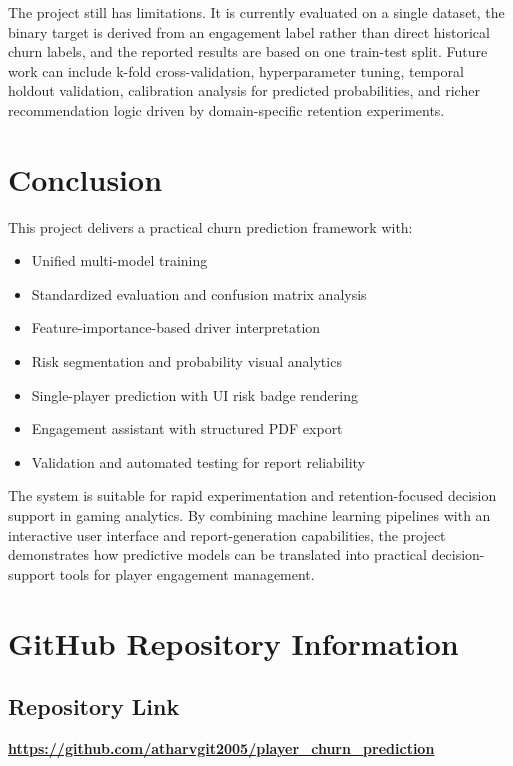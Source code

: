 \documentclass[conference]{IEEEtran}
\begin{document}
The project still has limitations. It is currently evaluated on a single dataset, the binary target is derived from an engagement label rather than direct historical churn labels, and the reported results are based on one train-test split. Future work can include k-fold cross-validation, hyperparameter tuning, temporal holdout validation, calibration analysis for predicted probabilities, and richer recommendation logic driven by domain-specific retention experiments.

\section{Conclusion}
This project delivers a practical churn prediction framework with:
\begin{itemize}
    \item Unified multi-model training
    \item Standardized evaluation and confusion matrix analysis
    \item Feature-importance-based driver interpretation
    \item Risk segmentation and probability visual analytics
    \item Single-player prediction with UI risk badge rendering
    \item Engagement assistant with structured PDF export
    \item Validation and automated testing for report reliability
\end{itemize}
The system is suitable for rapid experimentation and retention-focused decision support in gaming analytics. By combining machine learning pipelines with an interactive user interface and report-generation capabilities, the project demonstrates how predictive models can be translated into practical decision-support tools for player engagement management.




\appendix
\section{GitHub Repository Information}

\subsection{Repository Link}
\begin{center}
\textbf{\url{https://github.com/atharvgit2005/player_churn_prediction}}
\end{center}
\end{document}
